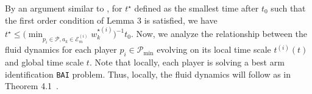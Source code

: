 \documentclass{article}
\begin{document}
By an argument similar to \cite{bandyopadhyay2024optimal}, for $t^{\star}$ defined as the smallest time after $t_{0}$ such that the first order condition of Lemma 3 is satisfied, we have $t^{\star}\leq \bigl(\min_{p_i\in\mathcal{P},a_k\in\mathcal{E}_{m}^{(i)}}w^{\star(i)}_k\bigr)^{-1}t_0$.
Now, we analyze the relationship between the fluid dynamics for each player $p_i\in\mathcal{P}_{\min}$ evolving on its local time scale $t^{(i)}(t)$ and global time scale $t$. Note that locally, each player is solving a best arm identification \texttt{BAI} problem. Thus, locally, the fluid dynamics will follow as in Theorem 4.1~\cite{bandyopadhyay2024optimal}. 
\end{document}
